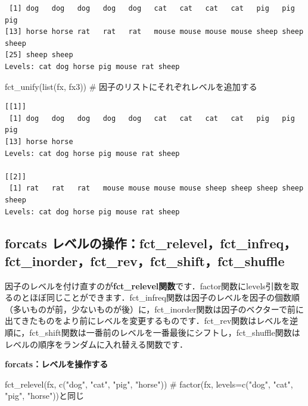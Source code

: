 \documentclass[
  letterpaper,
  DIV=11,
  numbers=noendperiod]{scrreprt}
\newenvironment{Shaded}{\begin{snugshade}}{\end{snugshade}}
\newcommand{\CommentTok}[1]{\textcolor[rgb]{0.37,0.37,0.37}{#1}}
\newcommand{\FunctionTok}[1]{\textcolor[rgb]{0.28,0.35,0.67}{#1}}
\newcommand{\NormalTok}[1]{\textcolor[rgb]{0.00,0.23,0.31}{#1}}
\newcommand{\StringTok}[1]{\textcolor[rgb]{0.13,0.47,0.30}{#1}}
\begin{document}
\begin{verbatim}
 [1] dog   dog   dog   dog   dog   cat   cat   cat   cat   pig   pig   pig  
[13] horse horse rat   rat   rat   mouse mouse mouse mouse sheep sheep sheep
[25] sheep sheep
Levels: cat dog horse pig mouse rat sheep
\end{verbatim}

\begin{Shaded}
\begin{Highlighting}[]
\FunctionTok{fct\_unify}\NormalTok{(}\FunctionTok{list}\NormalTok{(fx, fx3)) }\CommentTok{\# 因子のリストにそれぞれレベルを追加する}
\end{Highlighting}
\end{Shaded}

\begin{verbatim}
[[1]]
 [1] dog   dog   dog   dog   dog   cat   cat   cat   cat   pig   pig   pig  
[13] horse horse
Levels: cat dog horse pig mouse rat sheep

[[2]]
 [1] rat   rat   rat   mouse mouse mouse mouse sheep sheep sheep sheep sheep
Levels: cat dog horse pig mouse rat sheep
\end{verbatim}

\hypertarget{forcats-ux30ecux30d9ux30ebux306eux64cdux4f5cfct_relevelfct_infreqfct_inorderfct_revfct_shiftfct_shuffle}{%
\subsection{forcats
レベルの操作：fct\_relevel，fct\_infreq，fct\_inorder，fct\_rev，fct\_shift，fct\_shuffle}\label{forcats-ux30ecux30d9ux30ebux306eux64cdux4f5cfct_relevelfct_infreqfct_inorderfct_revfct_shiftfct_shuffle}}

因子のレベルを付け直すのが\textbf{fct\_relevel関数}です．factor関数にlevels引数を取るのとほぼ同じことができます．fct\_infreq関数は因子のレベルを因子の個数順（多いものが前，少ないものが後）に，fct\_inorder関数は因子のベクターで前に出てきたものをより前にレベルを変更するものです．fct\_rev関数はレベルを逆順に，fct\_shift関数は一番前のレベルを一番最後にシフトし，fct\_shuffle関数はレベルの順序をランダムに入れ替える関数です．

\textbf{forcats：レベルを操作する}

\begin{Shaded}
\begin{Highlighting}[]
\FunctionTok{fct\_relevel}\NormalTok{(fx, }\FunctionTok{c}\NormalTok{(}\StringTok{"dog"}\NormalTok{, }\StringTok{"cat"}\NormalTok{, }\StringTok{"pig"}\NormalTok{, }\StringTok{"horse"}\NormalTok{)) }\CommentTok{\# factor(fx, levels=c("dog", "cat", "pig", "horse"))と同じ}
\end{Highlighting}
\end{Shaded}
\end{document}
